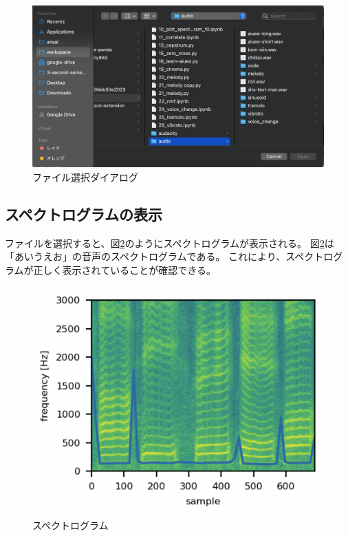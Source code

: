 \documentclass[a4paper,11pt]{jsarticle}
\begin{document}
\begin{figure}[h]
\centering
\includegraphics[keepaspectratio, width=13cm]
{./images/file_select_dialog.png}
\caption{ファイル選択ダイアログ}
\label{fig:file_select_dialog}
\end{figure}

\subsection{スペクトログラムの表示}

ファイルを選択すると、図\ref{fig:spectrogram}のようにスペクトログラムが表示される。
図\ref{fig:spectrogram}は「あいうえお」の音声のスペクトログラムである。
これにより、スペクトログラムが正しく表示されていることが確認できる。

\begin{figure}[h]
\centering
\includegraphics[keepaspectratio, width=13cm]
{./images/spectrogram.png}
\caption{スペクトログラム}
\label{fig:spectrogram}
\end{figure}
\end{document}
